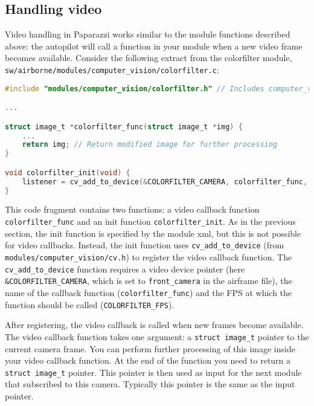 \documentclass{article}
\begin{document}
\subsection{Handling video}\label{sec:video}
Video handling in Paparazzi works similar to the module functions described above: the autopilot will call a function in your module when a new video frame becomes available. Consider the following extract from the colorfilter module, \texttt{sw/airborne/modules/computer\_vision/colorfilter.c}:
\begin{lstlisting}[language=c]
#include "modules/computer_vision/colorfilter.h" // Includes computer_vision/cv.h!

...

struct image_t *colorfilter_func(struct image_t *img) {
	...
	return img; // Return modified image for further processing
}

void colorfilter_init(void) {
	listener = cv_add_to_device(&COLORFILTER_CAMERA, colorfilter_func, COLORFILTER_FPS);
}
\end{lstlisting}
This code fragment contains two functions: a video callback function \texttt{colorfilter\_func} and an init function \texttt{colorfilter\_init}.
As in the previous section, the init function is specified by the module xml, but this is not possible for video callbacks.
Instead, the init function uses \texttt{cv\_add\_to\_device} (from \texttt{modules/computer\_vision/cv.h}) to register the video callback function. The \texttt{cv\_add\_to\_device} function requires a video device pointer (here \texttt{\&COLORFILTER\_CAMERA}, which is set to \texttt{front\_camera} in the airframe file), the name of the callback function (\texttt{colorfilter\_func}) and the FPS at which the function should be called (\texttt{COLORFILTER\_FPS}).

After registering, the video callback is called when new frames become available.
The video callback function takes one argument: a \texttt{struct image\_t} pointer to the current camera frame. You can perform further processing of this image inside your video callback function.
At the end of the function you need to return a \texttt{struct image\_t} pointer. This pointer is then used as input for the next module that subscribed to this camera. Typically this pointer is the same as the input pointer.
\end{document}
